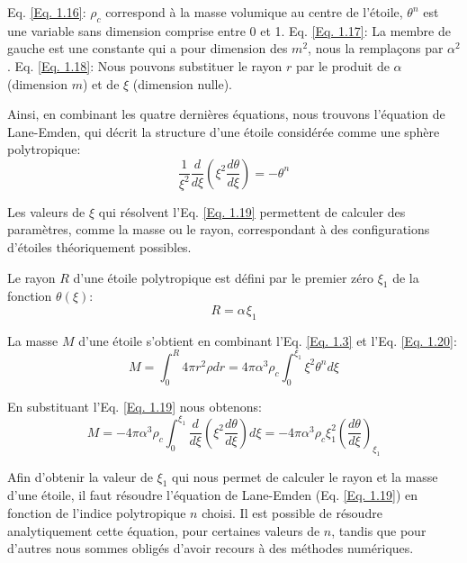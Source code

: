 Eq. \ref{Eq. 1.16}: $\rho_{c}$ correspond à la masse volumique au centre de l'étoile, $\theta^{n}$ est une variable sans dimension
comprise entre 0 et 1.\smallskip\newline
Eq. \ref{Eq. 1.17}: La membre de gauche est une constante qui a pour dimension des $m^{2}$, nous la remplaçons par $\alpha^{2}$.\smallskip\newline
Eq. \ref{Eq. 1.18}: Nous pouvons substituer le rayon $r$ par le produit de $\alpha$ (dimension $m$) et de $\xi$ (dimension nulle).\bigskip

Ainsi, en combinant les quatre dernières équations, nous trouvons l'équation de Lane-Emden\footnotemark[6], qui décrit la structure d'une étoile considérée comme une sphère polytropique:\begin{equation}\boxed{\dfrac{1}{\xi^{2}}\dfrac{d}{d\xi}\left( \xi^{2}\dfrac{d\theta}{d\xi}\right) =-\theta^{n}}\label{Eq. 1.19}\end{equation}

Les valeurs de $\xi$ qui résolvent l'Eq. \ref{Eq. 1.19} permettent de calculer des paramètres, comme la masse ou le rayon\footnotemark[7], correspondant à des configurations d'étoiles théoriquement possibles.\smallskip 

Le rayon $R$ d'une étoile polytropique est défini par le premier zéro $\xi_{1}$ de la fonction $\theta(\xi)$\footnotemark[8]:\begin{equation}R=\alpha\hspace{1pt}\xi_{1}\label{Eq. 1.20}\end{equation}

La masse $M$ d'une étoile s'obtient en combinant l'Eq. \ref{Eq. 1.3} et l'Eq. \ref{Eq. 1.20}:\begin{equation}M=\int_{0}^{R}4\pi r^{2}\rho dr=4\pi \alpha^{3} \rho_{c}\int_{0}^{\xi_{1}}\xi^{2}\theta^{n}d\xi\label{Eq. 1.21}\end{equation}

En substituant l'Eq. \ref{Eq. 1.19} nous obtenons:\begin{equation}M=-4\pi \alpha^{3}\rho_{c}\int_{0}^{\xi_{1}}\dfrac{d}{d\xi}\left(\xi^2\dfrac{d\theta}{d\xi}\right)d\xi=-4\pi \alpha^{3}\rho_{c}\xi^{2}_{1}\left( \dfrac{d\theta}{d\xi}\right)_{\xi_{1}}\label{Eq. 1.22}\end{equation}\bigskip

Afin d'obtenir la valeur de $\xi_{1}$ qui nous permet de calculer le rayon et la masse d'une étoile, il faut résoudre l'équation de Lane-Emden (Eq. \ref{Eq. 1.19}) en fonction de l'indice polytropique $n$ choisi. Il est possible de résoudre analytiquement cette équation, pour certaines valeurs de $n$, tandis que pour d'autres nous sommes obligés d'avoir recours à des méthodes numériques.\smallskip 

